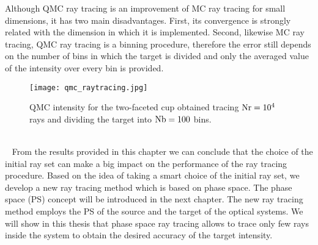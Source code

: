 Although QMC ray tracing is an improvement of MC ray tracing for small dimensions, it has two main disadvantages. 
First, its convergence is strongly related with the dimension in which it is implemented.
Second, likewise MC ray tracing, QMC ray tracing is a binning procedure, therefore the error still depends on the number of bins in which the target is divided and only the averaged value of the intensity over every bin is provided.
\begin{figure}[h]\vspace{-3cm}
\begin{center}
    \texttt{[image: qmc\_raytracing.jpg]}
    \caption{QMC intensity for the two-faceted cup obtained tracing $\textrm{Nr}=10^4$ rays and dividing the target into $\textrm{Nb}=100$ bins.}
    \label{fig:qmc_intensity}
\end{center}
  \end{figure}
 \\\ \indent
From the results provided in this chapter we can conclude that the choice of the initial ray set can make a big impact on the performance of the ray tracing procedure. 
Based on the idea of taking a smart choice of the initial ray set, we develop a new ray tracing method which is based on phase space. 
The phase space (PS) concept will be introduced in the next chapter. The new ray tracing method employs the PS of the source and the target of the optical systems.
We will show in this thesis that phase space ray tracing allows to trace only few rays inside the system to obtain the desired accuracy of the target intensity. 





















